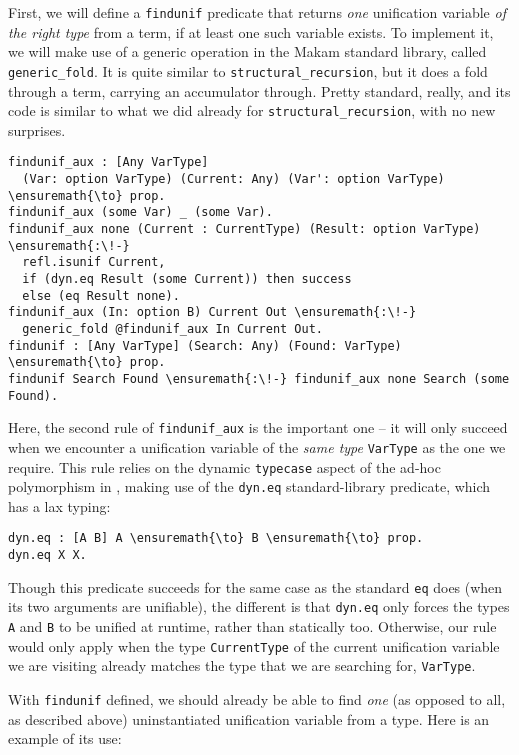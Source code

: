 First, we will define a \texttt{findunif} predicate that returns
\emph{one} unification variable \emph{of the right type} from a term, if
at least one such variable exists. To implement it, we will make use of
a generic operation in the Makam standard library, called
\texttt{generic\_fold}. It is quite similar to
\texttt{structural\_recursion}, but it does a fold through a term,
carrying an accumulator through. Pretty standard, really, and its code
is similar to what we did already for \texttt{structural\_recursion},
with no new surprises.

\begin{verbatim}
findunif_aux : [Any VarType]
  (Var: option VarType) (Current: Any) (Var': option VarType) \ensuremath{\to} prop.
findunif_aux (some Var) _ (some Var).
findunif_aux none (Current : CurrentType) (Result: option VarType) \ensuremath{:\!-}
  refl.isunif Current,
  if (dyn.eq Result (some Current)) then success
  else (eq Result none).
findunif_aux (In: option B) Current Out \ensuremath{:\!-}
  generic_fold @findunif_aux In Current Out.
findunif : [Any VarType] (Search: Any) (Found: VarType) \ensuremath{\to} prop.
findunif Search Found \ensuremath{:\!-} findunif_aux none Search (some Found).
\end{verbatim}

Here, the second rule of \texttt{findunif\_aux} is the important one --
it will only succeed when we encounter a unification variable of the
\emph{same type} \texttt{VarType} as the one we require. This rule
relies on the dynamic \texttt{typecase} aspect of the ad-hoc
polymorphism in \lamprolog, making use of the \texttt{dyn.eq}
standard-library predicate, which has a lax typing:

\begin{verbatim}
dyn.eq : [A B] A \ensuremath{\to} B \ensuremath{\to} prop.
dyn.eq X X.
\end{verbatim}

Though this predicate succeeds for the same case as the standard
\texttt{eq} does (when its two arguments are unifiable), the different
is that \texttt{dyn.eq} only forces the types \texttt{A} and \texttt{B}
to be unified at runtime, rather than statically too. Otherwise, our
rule would only apply when the type \texttt{CurrentType} of the current
unification variable we are visiting already matches the type that we
are searching for, \texttt{VarType}.

With \texttt{findunif} defined, we should already be able to find
\emph{one} (as opposed to all, as described above) uninstantiated
unification variable from a type. Here is an example of its use:

